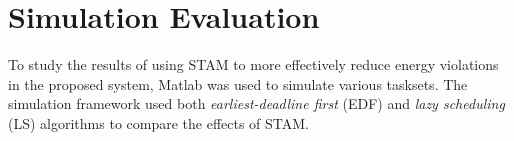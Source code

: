 \section{Simulation Evaluation} \label{sec:simulation}

To study the results of using STAM to more effectively reduce energy violations in the proposed system, Matlab was used to simulate various tasksets. The simulation framework used both \emph{earliest-deadline first} (EDF) and \emph{lazy scheduling} (LS) algorithms to compare the effects of STAM.